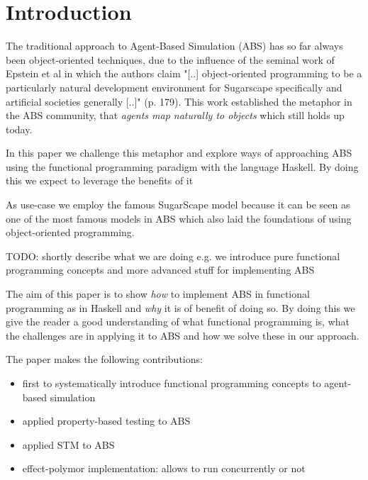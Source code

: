 \section{Introduction}
The traditional approach to Agent-Based Simulation (ABS) has so far always been object-oriented techniques, due to the influence of the seminal work of Epstein et al \cite{epstein_growing_1996} in which the authors claim "[..] object-oriented programming to be a particularly natural development environment for Sugarscape specifically and artificial societies generally [..]" (p. 179). This work established the metaphor in the ABS community, that \textit{agents map naturally to objects} \cite{north_managing_2007} which still holds up today.

In this paper we challenge this metaphor and explore ways of approaching ABS using the functional programming paradigm with the language Haskell. By doing this we expect to leverage the benefits of it %

As use-case we employ the famous SugarScape model \cite{epstein_growing_1996} because it can be seen as one of the most famous models in ABS which also laid the foundations of using object-oriented programming.

TODO: shortly describe what we are doing e.g. we introduce pure functional programming concepts and more advanced stuff for implementing ABS

The aim of this paper is to show \textit{how} to implement ABS in functional programming as in Haskell and \textit{why} it is of benefit of doing so. By doing this we give the reader a good understanding of what functional programming is, what the challenges are in applying it to ABS and how we solve these in our approach. 

The paper makes the following contributions:

\begin{itemize}
	\item first to systematically introduce functional programming concepts to agent-based simulation
	\item applied property-based testing to ABS
	\item applied STM to ABS
	\item effect-polymor implementation: allows to run concurrently or not
\end{itemize}